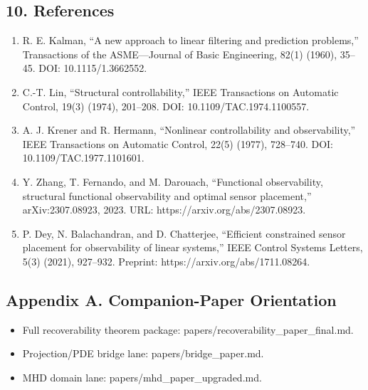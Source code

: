 \documentclass[11pt]{article}
\begin{document}
\subsection*{10. References}
\begin{enumerate}
\item R. E. Kalman, “A new approach to linear filtering and prediction problems,” Transactions of the ASME—Journal of Basic Engineering, 82(1) (1960), 35–45. DOI: 10.1115/1.3662552.
\item C.-T. Lin, “Structural controllability,” IEEE Transactions on Automatic Control, 19(3) (1974), 201–208. DOI: 10.1109/TAC.1974.1100557.
\item A. J. Krener and R. Hermann, “Nonlinear controllability and observability,” IEEE Transactions on Automatic Control, 22(5) (1977), 728–740. DOI: 10.1109/TAC.1977.1101601.
\item Y. Zhang, T. Fernando, and M. Darouach, “Functional observability, structural functional observability and optimal sensor placement,” arXiv:2307.08923, 2023. URL: https://arxiv.org/abs/2307.08923.
\item P. Dey, N. Balachandran, and D. Chatterjee, “Efficient constrained sensor placement for observability of linear systems,” IEEE Control Systems Letters, 5(3) (2021), 927–932. Preprint: https://arxiv.org/abs/1711.08264.
\end{enumerate}

\subsection*{Appendix A. Companion-Paper Orientation}
\begin{itemize}
\item Full recoverability theorem package: papers/recoverability\_paper\_final.md.
\item Projection/PDE bridge lane: papers/bridge\_paper.md.
\item MHD domain lane: papers/mhd\_paper\_upgraded.md.
\end{itemize}
\end{document}
